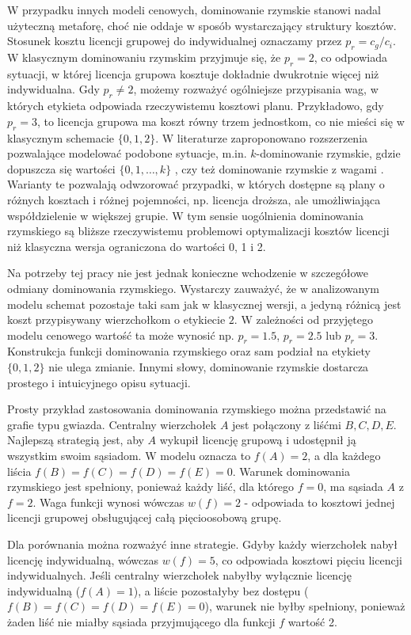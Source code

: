 W przypadku innych modeli cenowych, dominowanie rzymskie stanowi nadal użyteczną metaforę, choć nie oddaje w sposób wystarczający struktury kosztów. 
Stosunek kosztu licencji grupowej do indywidualnej oznaczamy przez $p_r = c_g / c_i$. W klasycznym dominowaniu rzymskim przyjmuje się, że $p_r=2$, co odpowiada sytuacji, w której licencja grupowa kosztuje dokładnie dwukrotnie więcej niż indywidualna.
Gdy $p_r \neq 2$, możemy rozważyć ogólniejsze przypisania wag, w których etykieta odpowiada rzeczywistemu kosztowi planu. Przykładowo, gdy $p_r=3$, to licencja grupowa ma koszt równy trzem jednostkom, co nie mieści się w klasycznym schemacie $\{0,1,2\}$. W literaturze zaproponowano rozszerzenia pozwalające modelować podobone sytuacje, m.in. $k$-dominowanie rzymskie, gdzie dopuszcza się wartości $\{0,1,\dots,k\}$ \cite{CHAUDHARY2024301}, czy też dominowanie rzymskie z wagami \cite{Ghaffari2020}. Warianty te pozwalają odwzorować przypadki, w których dostępne są plany o różnych kosztach i różnej pojemności, np. licencja droższa, ale umożliwiająca współdzielenie w większej grupie. W tym sensie uogólnienia dominowania rzymskiego są bliższe rzeczywistemu problemowi optymalizacji kosztów licencji niż klasyczna wersja ograniczona do wartości 0, 1 i 2.

Na potrzeby tej pracy nie jest jednak konieczne wchodzenie w szczegółowe odmiany dominowania rzymskiego. Wystarczy zauważyć, że w analizowanym modelu schemat pozostaje taki sam jak w klasycznej wersji, a jedyną różnicą jest koszt przypisywany wierzchołkom o etykiecie $2$. W zależności od przyjętego modelu cenowego wartość ta może wynosić np. $p_r=1.5$, $p_r=2.5$ lub $p_r=3$. Konstrukcja funkcji dominowania rzymskiego oraz sam podział na etykiety $\{0,1,2\}$ nie ulega zmianie. Innymi słowy, dominowanie rzymskie dostarcza prostego i intuicyjnego opisu sytuacji.

Prosty przykład zastosowania dominowania rzymskiego można przedstawić na grafie typu gwiazda. Centralny wierzchołek $A$ jest połączony z liśćmi $B, C, D, E$. Najlepszą strategią jest, aby $A$ wykupił licencję grupową i udostępnił ją wszystkim swoim sąsiadom. W modelu oznacza to $f(A)=2$, a dla każdego liścia $f(B)=f(C)=f(D)=f(E)=0$. Warunek dominowania rzymskiego jest spełniony, ponieważ każdy liść, dla którego $f=0$, ma sąsiada $A$ z $f=2$. Waga funkcji wynosi wówczas $w(f)=2$ - odpowiada to kosztowi jednej licencji grupowej obsługującej całą pięcioosobową grupę.

Dla porównania można rozważyć inne strategie. Gdyby każdy wierzchołek nabył licencję indywidualną, wówczas $w(f)=5$, co odpowiada kosztowi pięciu licencji indywidualnych. Jeśli centralny wierzchołek nabyłby wyłącznie licencję indywidualną ($f(A)=1$), a liście pozostałyby bez dostępu ($f(B)=f(C)=f(D)=f(E)=0$), warunek nie byłby spełniony, ponieważ żaden liść nie miałby sąsiada przyjmującego dla funkcji $f$ wartość 2.

